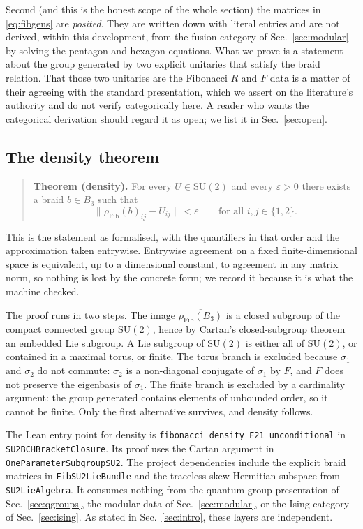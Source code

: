 \documentclass[aps,prx,nofootinbib,superscriptaddress,12pt]{revtex4-2}
\begin{document}
Second (and this is the honest scope of the whole section) the
matrices in \eqref{eq:fibgens} are \emph{posited}. They are written down
with literal entries and are not derived, within this development, from
the fusion category of Sec.~\ref{sec:modular} by solving the pentagon
and hexagon equations. What we prove is a statement about the group
generated by two explicit unitaries that satisfy the braid relation. That
those two unitaries are the Fibonacci $R$ and $F$ data is a matter of
their agreeing with the standard presentation, which we assert on the
literature's authority and do not verify categorically here. A reader
who wants the categorical derivation should regard it as open; we list
it in Sec.~\ref{sec:open}.

\subsection{The density theorem}

\begin{quote}
\textbf{Theorem (density).} For every $U \in \mathrm{SU}(2)$ and every
$\varepsilon > 0$ there exists a braid $b \in B_3$ such that
\[
\bigl\lVert \rho_{\mathrm{Fib}}(b)_{ij} - U_{ij} \bigr\rVert < \varepsilon
\qquad \text{for all } i,j \in \{1,2\}.
\]
\end{quote}

This is the statement as formalised, with the quantifiers in that order
and the approximation taken entrywise. Entrywise agreement on a fixed
finite-dimensional space is equivalent, up to a dimensional constant, to
agreement in any matrix norm, so nothing is lost by the concrete form;
we record it because it is what the machine checked.

The proof runs in two steps. The image
$\overline{\rho_{\mathrm{Fib}}(B_3)}$ is a closed subgroup of the compact
connected group $\mathrm{SU}(2)$, hence by Cartan's closed-subgroup
theorem an embedded Lie subgroup. A Lie subgroup of $\mathrm{SU}(2)$ is
either all of $\mathrm{SU}(2)$, or contained in a maximal torus, or
finite. The torus branch is excluded because $\sigma_1$ and $\sigma_2$
do not commute: $\sigma_2$ is a non-diagonal conjugate of $\sigma_1$
by $F$, and $F$ does not preserve the eigenbasis of $\sigma_1$. The
finite branch is excluded by a cardinality argument: the group generated
contains elements of unbounded order, so it cannot be finite. Only the
first alternative survives, and density follows.

The Lean entry point for density is
\texttt{fibonacci\_density\_F21\_unconditional} in
\texttt{SU2BCHBracketClosure}. Its proof uses the Cartan argument in
\texttt{OneParameterSubgroupSU2}. The project dependencies include the
explicit braid matrices in \texttt{FibSU2LieBundle} and the traceless
skew-Hermitian subspace from \texttt{SU2LieAlgebra}. It consumes nothing
from the quantum-group presentation of Sec.~\ref{sec:qgroups}, the
modular data of Sec.~\ref{sec:modular}, or the Ising category of
Sec.~\ref{sec:ising}. As stated in Sec.~\ref{sec:intro}, these layers
are independent.
\end{document}
